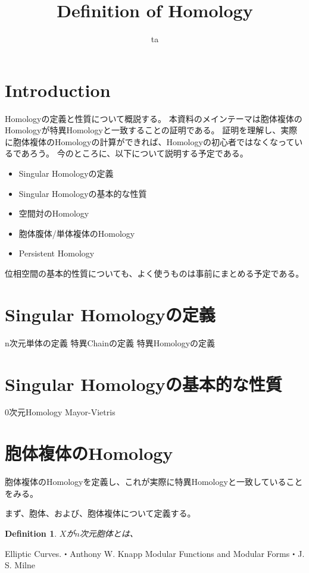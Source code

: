 \documentclass{ujarticle}
\title{Definition of Homology}
\author{ta}
\newtheorem{dfn}[thm]{Definition}
\begin{document}
\maketitle
\section{Introduction}
\label{sec:Introduction}

Homologyの定義と性質について概説する。
本資料のメインテーマは胞体複体のHomologyが特異Homologyと一致することの証明である。
証明を理解し、実際に胞体複体のHomologyの計算ができれば、Homologyの初心者ではなくなっているであろう。
今のところに、以下について説明する予定である。
\begin{itemize}
  \setlength{\parskip}{0cm} %
  \setlength{\itemsep}{0cm} %
  \item Singular Homologyの定義
  \item Singular Homologyの基本的な性質
  \item 空間対のHomology
  \item 胞体腹体/単体複体のHomology
  \item Persistent Homology
\end{itemize}

位相空間の基本的性質についても、よく使うものは事前にまとめる予定である。

\section{Singular Homologyの定義}
\label{sec:Singular Homologyの定義}

n次元単体の定義
特異Chainの定義
特異Homologyの定義

\section{Singular Homologyの基本的な性質}
\label{sec:Singular Homologyの基本的な性質}
0次元Homology
Mayor-Vietris

\section{胞体複体のHomology}
\label{sec:胞体複体のHomology}
胞体複体のHomologyを定義し、これが実際に特異Homologyと一致していることをみる。

まず、胞体、および、胞体複体について定義する。

\begin{dfn}
  $X$が$n$次元胞体とは、
\end{dfn}





\begin{thebibliography}{数字}
   Elliptic Curves.・Anthony W. Knapp
   Modular Functions and Modular Forms・J. S. Milne
\end{thebibliography}
\end{document}
